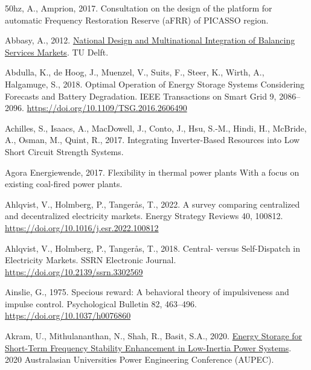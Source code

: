 \documentclass[12pt,a4paper,]{report}
\newlength{\cslhangindent}
\newenvironment{CSLReferences}[2] %
 {%
  \setlength{\parindent}{0pt}
  \ifodd #1 \everypar{\setlength{\hangindent}{\cslhangindent}}\ignorespaces\fi
  \ifnum #2 > 0
  \setlength{\parskip}{#2\baselineskip}
  \fi
 }%
 {}
\begin{document}
\hypertarget{refs}{}
\begin{CSLReferences}{1}{0}
\leavevmode{}%
50hz, A., Amprion, 2017. Consultation on the design of the platform for
automatic {Frequency Restoration Reserve} ({aFRR}) of {PICASSO} region.

\leavevmode{}%
Abbasy, A., 2012.
\href{https://doi.org/10.4233/uuid:71f7138f-3af2-4bc3-b035-a3e42b3cafaf}{National
{Design} and {Multinational Integration} of {Balancing Services
Markets}}. {TU Delft}.

\leavevmode{}%
Abdulla, K., de Hoog, J., Muenzel, V., Suits, F., Steer, K., Wirth, A.,
Halgamuge, S., 2018. Optimal {Operation} of {Energy Storage Systems
Considering Forecasts} and {Battery Degradation}. IEEE Transactions on
Smart Grid 9, 2086--2096. \url{https://doi.org/10.1109/TSG.2016.2606490}

\leavevmode{}%
Achilles, S., Isaacs, A., MacDowell, J., Conto, J., Hsu, S.-M., Hindi,
H., McBride, A., Osman, M., Quint, R., 2017. Integrating {Inverter-Based
Resources} into {Low Short Circuit Strength Systems}.

\leavevmode{}%
Agora Energiewende, 2017. Flexibility in thermal power plants {With} a
focus on existing coal-fired power plants.

\leavevmode{}%
Ahlqvist, V., Holmberg, P., Tangerås, T., 2022. A survey comparing
centralized and decentralized electricity markets. Energy Strategy
Reviews 40, 100812. \url{https://doi.org/10.1016/j.esr.2022.100812}

\leavevmode{}%
Ahlqvist, V., Holmberg, P., Tangerås, T., 2018. Central- versus
{Self-Dispatch} in {Electricity Markets}. SSRN Electronic Journal.
\url{https://doi.org/10.2139/ssrn.3302569}

\leavevmode{}%
Ainslie, G., 1975. Specious reward: {A} behavioral theory of
impulsiveness and impulse control. Psychological Bulletin 82, 463--496.
\url{https://doi.org/10.1037/h0076860}

\leavevmode{}%
Akram, U., Mithulananthan, N., Shah, R., Basit, S.A., 2020.
\href{https://www.semanticscholar.org/paper/Energy-Storage-for-Short-Term-Frequency-Stability-Akram-Mithulananthan/b74131f080c15125436fe65784135492fa318b02}{Energy
{Storage} for {Short-Term Frequency Stability Enhancement} in
{Low-Inertia Power Systems}}. 2020 Australasian Universities Power
Engineering Conference (AUPEC).


\end{CSLReferences}
\end{document}
